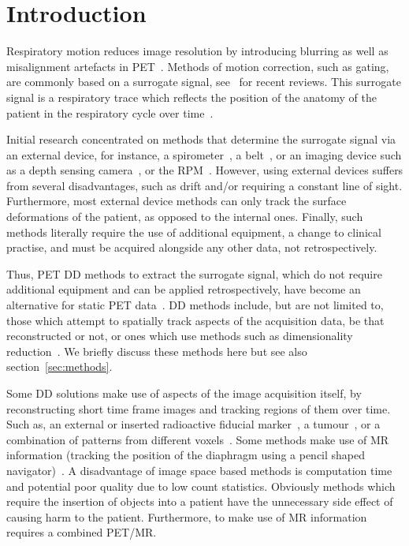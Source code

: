 \section{Introduction} \label{sec:introduction}
    Respiratory motion reduces image resolution by introducing blurring as well as misalignment artefacts in \gls{PET}~\parencite{Nehmeh2008a}. Methods of motion correction, such as gating, are commonly based on a surrogate signal, see~\parencite{Lamare2022PETVadis, Kyme2021MotionCT} for recent reviews. This surrogate signal is a respiratory trace which reflects the position of the anatomy of the patient in the respiratory cycle over time~\parencite{Kesner2010AMethods, Kesner2013GatingPET}.
    
    Initial research concentrated on methods that determine the surrogate signal via an external device, for instance, a spirometer~\parencite{Voscopoulos2013EvaluationScenarios}, a belt~\parencite{Yu2016}, or an imaging device such as a depth sensing camera~\parencite{Silverstein2018ComparativeSensor, Xia2012AConcept}, or the \gls{RPM}~\parencite{Bettinardi2013Motion-trackingPET/CT}. However, using external devices suffers from several disadvantages, such as  drift and/or requiring a constant line of sight. Furthermore, most external device methods can only track the surface deformations of the patient, as opposed to the internal ones. Finally, such methods literally require the use of additional equipment, a change to clinical practise, and must be acquired alongside any other data, not retrospectively.
    
    Thus, \gls{PET} \gls{DD} methods to extract the surrogate signal, which do not require additional equipment and can be applied retrospectively, have become an alternative for static \gls{PET} data~\parencite{Kesner2014OnFramework}. \gls{DD} methods include, but are not limited to, those which attempt to spatially track aspects of the acquisition data, be that reconstructed or not, or ones which use methods such as dimensionality reduction~\parencite{Lamare2022PETVadis}. We briefly discuss these methods here but see also section~\ref{sec:methods}.
    
    Some \gls{DD} solutions make use of aspects of the image acquisition itself, by reconstructing short time frame images and tracking regions of them over time. Such as, an external or inserted radioactive fiducial marker~\parencite{Buther2013ExternalTomography., Zimmermann2003UseMRI}, a tumour~\parencite{Bundschuh2007}, or a combination of patterns from different voxels~\parencite{Kesner2009RespiratoryData}. Some methods make use of \gls{MR} information (tracking the position of the diaphragm using a pencil shaped navigator)~\parencite{Taylor1997MRAngiography, Furst2015MotionPET/MR}. A disadvantage of image space based methods is computation time and potential poor quality due to low count statistics. Obviously methods which require the insertion of objects into a patient have the unnecessary side effect of causing harm to the patient. Furthermore, to make use of \gls{MR} information requires a combined \gls{PET}/\gls{MR}.
    
